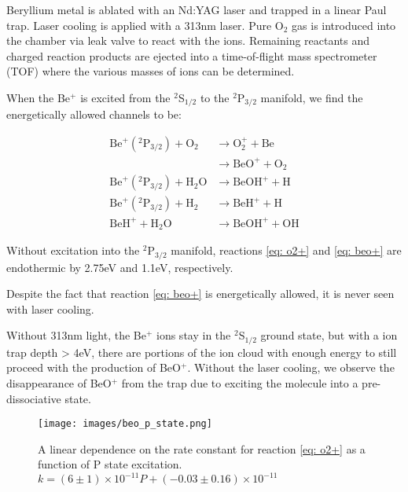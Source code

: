 Beryllium metal is ablated with an Nd:YAG laser and trapped in a linear Paul trap. Laser cooling is applied with a 313nm laser. Pure O$_2$ gas is introduced into the chamber via leak valve to react with the ions. Remaining reactants and charged reaction products are ejected into a time-of-flight mass spectrometer (TOF) where the various masses of ions can be determined.

When the Be$^+$ is excited from the $^2$S$_{1/2}$ to the $^2$P$_{3/2}$ manifold, we find the energetically allowed channels to be:

\begin{align}
    \text{Be}^+(^2\text{P}_{3/2}) + \text{O}_2 & \to \text{O}_2^+ + \text{Be} \label{eq: o2+} \\
    & \to \text{BeO}^+ + \text{O}_2 \label{eq: beo+} \\
    \text{Be}^+(^2\text{P}_{3/2}) + \text{H$_2$O} & \to \text{BeOH}^+ + \text{H} \\
    \text{Be}^+(^2\text{P}_{3/2}) + \text{H}_2 & \to \text{BeH}^+ + \text{H} \\
    \text{BeH}^+ + \text{H$_2$O} & \to \text{BeOH}^+ + \text{OH}
\end{align}

Without excitation into the $^2$P$_{3/2}$ manifold, reactions \ref{eq: o2+} and \ref{eq: beo+} are endothermic by 2.75eV and 1.1eV, respectively. 

Despite the fact that reaction \ref{eq: beo+} is energetically allowed, it is never seen with laser cooling.

Without 313nm light, the Be$^+$ ions stay in the $^2$S$_{1/2}$ ground state, but with a ion trap depth > 4eV, there are portions of the ion cloud with enough energy to still proceed with the production of BeO$^+$. Without the laser cooling, we observe the disappearance of BeO$^+$ from the trap due to exciting the molecule into a pre-dissociative state.

\begin{figure}[H]
\centering
\texttt{[image: images/beo\_p\_state.png]}
\caption{\label{fig: p-state} A linear dependence on the rate constant for reaction \ref{eq: o2+} as a function of P state excitation. $k = (6 \pm 1) \times 10^{-11} P + (-0.03 \pm 0.16) \times 10^{-11}$}
\end{figure}


